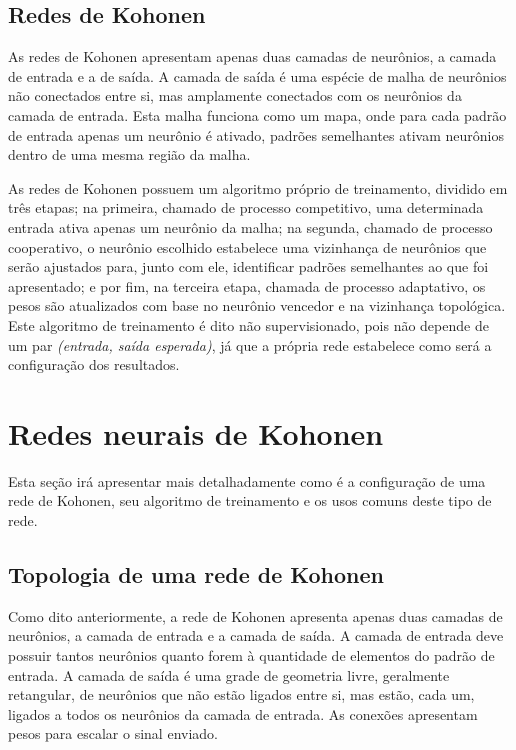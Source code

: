 \subsection{Redes de Kohonen}

As redes de Kohonen apresentam apenas duas camadas de neurônios, a camada de
entrada e a de saída. A camada de saída é uma espécie de malha de neurônios não
conectados entre si, mas amplamente conectados com os neurônios da camada de
entrada. Esta malha funciona como um mapa, onde para cada padrão de entrada
apenas um neurônio é ativado, padrões semelhantes ativam neurônios dentro de
uma mesma região da malha.

As redes de Kohonen possuem um algoritmo próprio de treinamento, dividido em
três etapas; na primeira, chamado de processo competitivo, uma determinada entrada
ativa apenas um neurônio da malha; na segunda, chamado de processo cooperativo,
o neurônio escolhido estabelece uma vizinhança de neurônios que serão ajustados
para, junto com ele, identificar padrões semelhantes ao que foi apresentado; e
por fim, na terceira etapa, chamada de processo adaptativo, os pesos são
atualizados com base no neurônio vencedor e na vizinhança topológica. Este
algoritmo de treinamento é dito não supervisionado, pois não depende de um
par \textit{(entrada, saída esperada)}, já que a própria rede estabelece como
será a configuração dos resultados.

\section{Redes neurais de Kohonen}

Esta seção irá apresentar mais detalhadamente como é a configuração de uma rede
de Kohonen, seu algoritmo de treinamento e os usos comuns deste tipo de rede.

\subsection{Topologia de uma rede de Kohonen}

Como dito anteriormente, a rede de Kohonen apresenta apenas duas camadas de
neurônios, a camada de entrada e a camada de saída. A camada de entrada deve
possuir tantos neurônios quanto forem à quantidade de elementos do padrão de
entrada. A camada de saída é uma grade de geometria livre, geralmente
retangular, de neurônios que não estão ligados entre si, mas estão, cada um,
ligados a todos os neurônios da camada de entrada. As conexões apresentam pesos
para escalar o sinal enviado.

